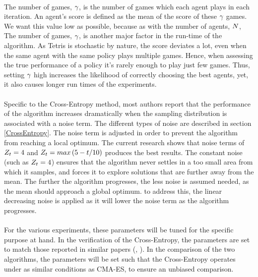 \\
The number of games, $\gamma$, 
is the number of games  which each agent 
plays in each iteration. An agent's score is defined as the 
mean of the score of these 
$\gamma$ games.
We want this value low as possible, because as with the number of
agents, $N$, The number of games, $\gamma$, 
is another major factor in the run-time of the algorithm.
As Tetris is stochastic by nature, the score deviates a lot, 
even when the
same agent with the same policy plays multiple games. 
Hence, when assessing the true
performance of a policy it's rarely enough to play just few games. Thus, setting 
$\gamma$ high increases the likelihood of correctly choosing the best 
agents, yet, it also causes longer run times of the experiments.\\
\\
Specific to the Cross-Entropy method, 
most authors report that the performance of the 
algorithm increases dramatically when the sampling 
distribution is associated with
a noise term. The different types of 
noise are described in section \ref{CrossEntropy}.
The noise term is adjusted in order to 
prevent the algorithm from reaching a local optimum.
The current research shows that noise terms of $Z_t = 4$ and 
$Z_t = max \left( 5 - t / 10 \right)$ 
\citep{thiery:09} produces the best results.
The constant noise (such as $Z_t = 4$) ensures that the algorithm
never settles in a too small area from which it samples, and forces it to explore
solutions that are further away from the mean. The further the 
algorithm progresses, 
the less noise is assumed needed, as the mean should approach a global optimum. to
address this, the linear decreasing noise 
is applied as it will lower the noise term
as the algorithm progresses.\\
\\
For the various experiments, these 
parameters will be tuned for the specific purpose 
at hand. In the verification of the Cross-Entropy, the parameters are set 
to match those reported in similar papers (\cite{thiery:09}, \cite{szita:06}).
In the comparison of the two algorithms, the parameters will be set such that 
the Cross-Entropy operates under as 
similar conditions as CMA-ES, to ensure an unbiased 
comparison.

